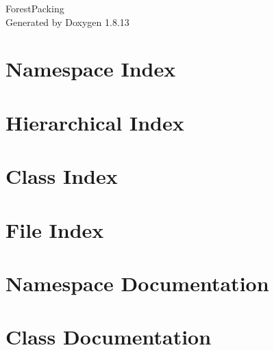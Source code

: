 \documentclass[twoside]{book}
\newcommand{\+}{\discretionary{\mbox{\scriptsize$\hookleftarrow$}}{}{}}
\newcommand{\clearemptydoublepage}{%
  \newpage{\pagestyle{empty}\cleardoublepage}%
}
\begin{document}
\hypersetup{pageanchor=false,
             bookmarksnumbered=true,
             pdfencoding=unicode
            }
\begin{titlepage}
\vspace*{7cm}
\begin{center}%
{\Large Forest\+Packing }\\
\vspace*{1cm}
{\large Generated by Doxygen 1.8.13}\\
\end{center}
\end{titlepage}
\clearemptydoublepage
{}
\tableofcontents
\clearemptydoublepage
{}
\hypersetup{pageanchor=true}

\chapter{Namespace Index}

\chapter{Hierarchical Index}

\chapter{Class Index}

\chapter{File Index}

\chapter{Namespace Documentation}

\chapter{Class Documentation}
































\end{document}
